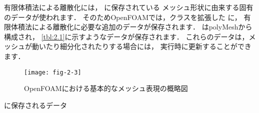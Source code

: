 有限体積法による離散化には，
に保存されている
%
%
メッシュ形状に由来する固有のデータが使われます．
そのためOpenFOAMでは，クラスを拡張した
%
%
に，
有限体積法による離散化に必要な追加のデータが保存されます．
は{polyMesh}から構成され，
\autoref{tbl:2.1}に示すようなデータが保存されます．
これらのデータは，メッシュが動いたり細分化されたりする場合には，
実行時に更新することができます．


\begin{figure}[ht]
 \texttt{[image: fig-2-3]}
 \caption{OpenFOAMにおける基本的なメッシュ表現の概略図}
 \label{fig:2.3}
\end{figure}


\begin{table}[ht]
 
 \caption{に保存されるデータ}
 \label{tbl:2.1}
\end{table}


